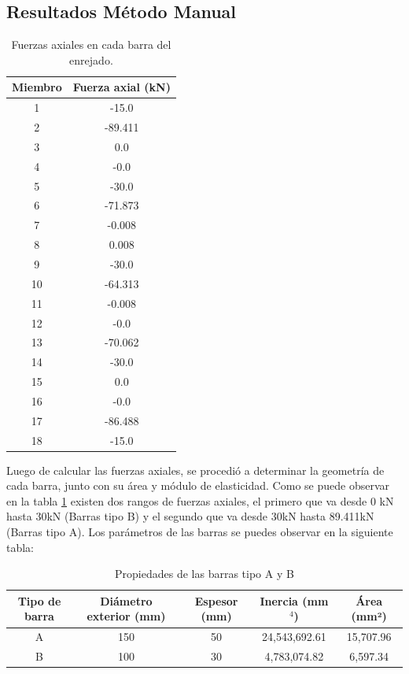 \documentclass{article}  %
\begin{document}
\subsection{Resultados Método Manual}
\begin{table}[h!]
  \centering
  \begin{tabular}{|c|c|}
  \hline
  \textbf{Miembro} & \textbf{Fuerza axial (kN)} \\
  \hline
  1  & -15.0   \\
  2  & -89.411 \\
  3  & 0.0     \\
  4  & -0.0    \\
  5  & -30.0   \\
  6  & -71.873 \\
  7  & -0.008  \\
  8  & 0.008   \\
  9  & -30.0   \\
  10 & -64.313 \\
  11 & -0.008  \\
  12 & -0.0    \\
  13 & -70.062 \\
  14 & -30.0   \\
  15 & 0.0     \\
  16 & -0.0    \\
  17 & -86.488 \\
  18 & -15.0   \\
  \hline
  \end{tabular}
  \caption{Fuerzas axiales en cada barra del enrejado.}
  \label{tab:1}
\end{table}
Luego de calcular las fuerzas axiales, se procedió a determinar la geometría de cada barra, junto con su área y módulo de elasticidad. Como se puede observar en la tabla \ref{tab:1} existen dos rangos de fuerzas axiales, el primero que va desde 0 kN hasta 30kN (Barras tipo B) y el segundo que va desde 30kN hasta 89.411kN (Barras tipo A). Los parámetros de las barras se puedes observar en la siguiente tabla:

\begin{table}[h!]
  \centering
  \begin{tabular}{|c|c|c|c|c|}
  \hline
  \textbf{Tipo de barra} & \textbf{Diámetro exterior (mm)} & \textbf{Espesor (mm)} & \textbf{Inercia (mm\(^4\))} & \textbf{Área (mm²)} \\
  \hline
  A  & 150 & 50  & 24,543,692.61 & 15,707.96 \\
  B  & 100 & 30  & 4,783,074.82  & 6,597.34  \\
  \hline
  \end{tabular}
  \caption{Propiedades de las barras tipo A y B}
\end{table}
  
\end{document}
